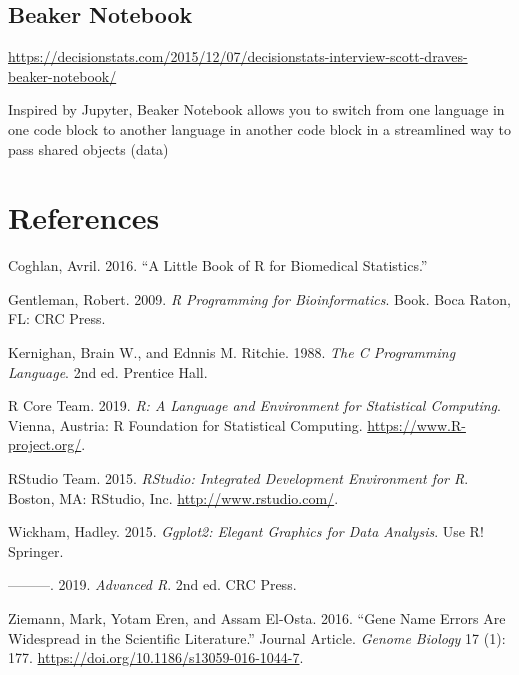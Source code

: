 \documentclass[]{book}
\begin{document}
\hypertarget{beaker}{%
\section{Beaker Notebook}\label{beaker}}

\url{https://decisionstats.com/2015/12/07/decisionstats-interview-scott-draves-beaker-notebook/}

Inspired by Jupyter, Beaker Notebook allows you to switch from one language in one code block to another language in another code block in a streamlined way to pass shared objects (data)

\hypertarget{References}{%
\chapter*{References}\label{References}}

\hypertarget{refs}{}
\leavevmode\hypertarget{ref-Coghlan:2016}{}%
Coghlan, Avril. 2016. ``A Little Book of R for Biomedical Statistics.''

\leavevmode\hypertarget{ref-Gentleman2009R-Programming-Bioinfo}{}%
Gentleman, Robert. 2009. \emph{R Programming for Bioinformatics}. Book. Boca Raton, FL: CRC Press.

\leavevmode\hypertarget{ref-Kernighan1988The-C-Programming-La}{}%
Kernighan, Brain W., and Ednnis M. Ritchie. 1988. \emph{The C Programming Language}. 2nd ed. Prentice Hall.

\leavevmode\hypertarget{ref-R-base}{}%
R Core Team. 2019. \emph{R: A Language and Environment for Statistical Computing}. Vienna, Austria: R Foundation for Statistical Computing. \url{https://www.R-project.org/}.

\leavevmode\hypertarget{ref-R-rstudio}{}%
RStudio Team. 2015. \emph{RStudio: Integrated Development Environment for R}. Boston, MA: RStudio, Inc. \url{http://www.rstudio.com/}.

\leavevmode\hypertarget{ref-Wickham2015ggplot2-Elegant-Gra}{}%
Wickham, Hadley. 2015. \emph{Ggplot2: Elegant Graphics for Data Analysis}. Use R! Springer.

\leavevmode\hypertarget{ref-Wickham:2019}{}%
---------. 2019. \emph{Advanced R}. 2nd ed. CRC Press.

\leavevmode\hypertarget{ref-Ziemann2016Gene-name-errors}{}%
Ziemann, Mark, Yotam Eren, and Assam El-Osta. 2016. ``Gene Name Errors Are Widespread in the Scientific Literature.'' Journal Article. \emph{Genome Biology} 17 (1): 177. \url{https://doi.org/10.1186/s13059-016-1044-7}.
\end{document}
